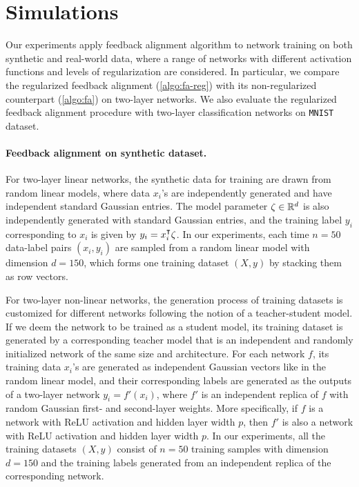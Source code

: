 \section{Simulations}

Our experiments apply feedback alignment algorithm to network training on both synthetic and real-world data, where a range of networks with different activation functions and levels of regularization are considered. In particular, we compare the regularized feedback alignment (\cref{algo:fa-reg}) with its non-regularized counterpart (\cref{algo:fa}) on two-layer networks. We also evaluate the regularized feedback alignment procedure with two-layer classification networks on \texttt{MNIST} dataset.

\paragraph{Feedback alignment on synthetic dataset.}

For two-layer linear networks, the synthetic data for training are drawn from random linear models, where data $x_i$'s are independently generated and have independent standard Gaussian entries. The model parameter $\zeta\in{\mathbb{R}^{d}}$ is also independently generated with standard Gaussian entries, and the training label $y_i$ corresponding to $x_i$ is given by $y_i = x_i\transpose \zeta$. In our experiments, each time $n = 50$ data-label pairs $(x_i,y_i)$ are sampled from a random linear model with dimension $d = 150$, which forms one training dataset $(X,y)$ by stacking them as row vectors.

For two-layer non-linear networks, the generation process of training datasets is customized for different networks following the notion of a teacher-student model. If we deem the network to be trained as a student model, its training dataset is generated by a corresponding teacher model that is an independent and randomly initialized network of the same size and architecture. For each network $f$, its training data $x_i$'s are generated as independent Gaussian vectors like in the random linear model, and their corresponding labels are generated as the outputs of a two-layer network $y_i = f'(x_i)$, where $f'$ is an independent replica of $f$ with random Gaussian first- and second-layer weights. More specifically, if $f$ is a network with ReLU activation and hidden layer width $p$, then $f'$ is also a network with ReLU activation and hidden layer width $p$. In our experiments, all the training datasets $(X,y)$ consist of $n = 50$ training samples with dimension $d = 150$ and the training labels generated from an independent replica of the corresponding network.

